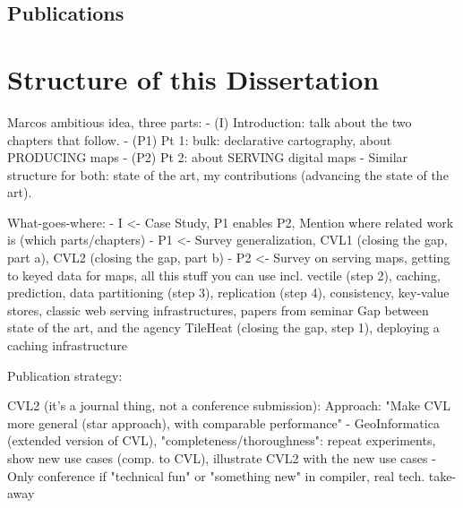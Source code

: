 \documentclass[11pt, oneside]{report}   	%
\begin{document}
\subsection{Publications}

\section{Structure of this Dissertation}







Marcos ambitious idea, three parts:
- (I) Introduction: talk about the two chapters that follow. 
- (P1) Pt 1: bulk: declarative cartography, about PRODUCING maps
- (P2) Pt 2: about SERVING digital maps
- Similar structure for both: state of the art, my contributions (advancing the state of the art).  

What-goes-where:
- I <- Case Study, P1 enables P2, Mention where related work is (which parts/chapters)
- P1 <- 
        Survey generalization, 
        CVL1 (closing the gap, part a), 
        CVL2 (closing the gap, part b)
- P2 <- 
        Survey on serving maps, getting to keyed data for maps, all this stuff you can use 
                incl. vectile (step 2),
                caching,
                prediction,
                data partitioning (step 3), 
                replication (step 4), 
                consistency, 
                key-value stores, 
                classic web serving infrastructures,
                papers from seminar
        Gap between state of the art, and the agency
        TileHeat (closing the gap, step 1), deploying a caching infrastructure
        
Publication strategy:

CVL2 (it's a journal thing, not a conference submission):
Approach: "Make CVL more general (star approach), with comparable performance"
- GeoInformatica (extended version of CVL), "completeness/thoroughness": repeat experiments, show new use cases (comp. to CVL), illustrate CVL2 with the new use cases 
- Only conference if "technical fun" or "something new" in compiler, real tech. take-away
\end{document}
